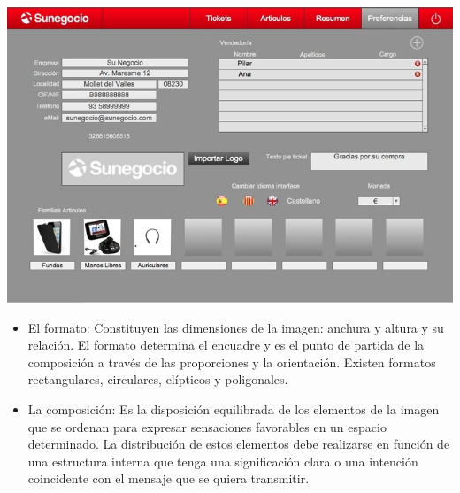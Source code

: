 \documentclass{beamer}
\begin{document}
\begin{frame}
\begin{center}
\includegraphics[scale = 0.4]{11.jpg}
\end{center}
\end{frame}


\begin{frame}
\begin{block}{}
\begin{itemize}
 \item El formato: Constituyen las dimensiones de la imagen: anchura y altura y su relación. El formato determina el encuadre y es el punto de partida de la composición a través de las proporciones y la orientación. Existen formatos rectangulares, circulares, elípticos y poligonales.   
 \item La composición: Es la disposición equilibrada de los elementos de la imagen que se ordenan para expresar sensaciones favorables en un espacio determinado. La distribución de estos elementos debe realizarse en función de una estructura interna que tenga una significación clara o una intención coincidente con el mensaje que se quiera transmitir.
\end{itemize}
\end{block}
\end{frame}
\end{document}
